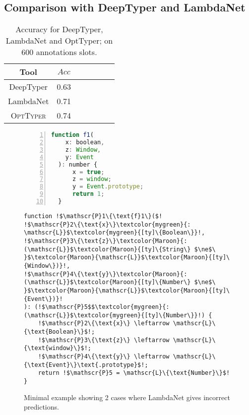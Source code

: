 \documentclass[acmsmall,nonacm]{acmart}\settopmatter{printfolios=true,printccs=false,printacmref=false}
\newcommand{\projectname}{\textsc{OptTyper}\xspace}
\begin{document}
\subsection{Comparison with DeepTyper and  LambdaNet}\label{ssec:typesubproblem}

\begin{table*}[t]
	\centering
	\caption{Accuracy for DeepTyper, LambdaNet and OptTyper; on $600$ annotations slots.}
		\label{tab:typeacc2}
	\begin{tabular}{ccccccc}
		\toprule
		Tool   &                              $Acc$ \\
		\midrule
		DeepTyper  & 0.63 \\
		LambdaNet  & 0.71 \\
		\projectname & 0.74\\
		\bottomrule
	\end{tabular}
\end{table*}
\begin{figure}[!t]
    \centering
    \begin{minipage}[t]{.38\textwidth}
        \raggedright
\begin{lstlisting}[language=JavaScript,label={lst:gold}, numbers=left]
  function f1(
    x: boolean,
    z: Window,
    y: Event
  ): number {
      x = true;
      z = window;
      y = Event.prototype;
      return 1;
  }
\end{lstlisting}
   \vspace{-5mm}
    \end{minipage}
    \begin{minipage}[t]{.57\textwidth}
        \raggedleft
\begin{lstlisting}[language=Fake,label={lst:lncode}] 
function !$\mathscr{P}1\{\text{f}1\}($!
!$\mathscr{P}2\{\text{x}\}\textcolor{mygreen}{: \mathscr{L}}$\textcolor{mygreen}{[ty]\{Boolean\}}!,
!$\mathscr{P}3\{\text{z}\}\textcolor{Maroon}{: (\mathscr{L}}$\textcolor{Maroon}{[ty]\{String\} $\ne$\ }$\textcolor{Maroon}{\mathscr{L}}$\textcolor{Maroon}{[ty]\{Window\})}!,
!$\mathscr{P}4\{\text{y}\}\textcolor{Maroon}{: (\mathscr{L}}$\textcolor{Maroon}{[ty]\{Number\} $\ne$\ }$\textcolor{Maroon}{\mathscr{L}}$\textcolor{Maroon}{[ty]\{Event\})}!
): (!$\mathscr{P}5$$\textcolor{mygreen}{: (\mathscr{L}}$\textcolor{mygreen}{[ty]\{Number\}}!) {
    !$\mathscr{P}2\{\text{x}\} \leftarrow \mathscr{L}\{\text{Boolean}\}$!;
    !$\mathscr{P}3\{\text{z}\} \leftarrow \mathscr{L}\{\text{window}\}$!;
    !$\mathscr{P}4\{\text{y}\} \leftarrow \mathscr{L}\{\text{Event}\}\text{.prototype}$!;
    return !$\mathscr{P}5 = \mathscr{L}\{\text{Number}\}$!
}
\end{lstlisting}
    \vspace{-5mm}
    \end{minipage}
    \caption{Minimal example showing 2 cases where LambdaNet gives incorrect predictions.}\label{fig:LambdaNet}
\end{figure}
\end{document}
